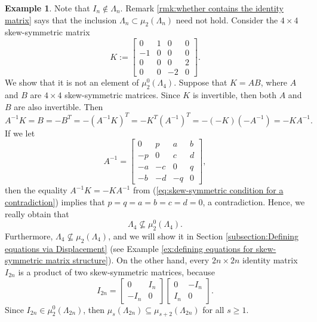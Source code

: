 \documentclass[reqno]{amsart}
\theoremstyle{definition}
\newtheorem{example}[theorem]{Example}
\numberwithin{equation}{section}
\begin{document}
\begin{example}
    Note that $I_n \notin \Lambda_n$. Remark \ref{rmk:whether contains the identity matrix} says that the inclusion $\Lambda_n \subset \mu_2(\Lambda_n)$ need not hold. Consider the $4 \times 4$ skew-symmetric matrix 
    \begin{equation*}
        K:=\begin{bmatrix}
            0 & 1 & 0 & 0\\
            -1 & 0 & 0 & 0\\
            0 & 0 & 0 & 2\\
            0 & 0 & -2 & 0
        \end{bmatrix}.
    \end{equation*}
    We show that it is not an element of $\mu_2^0(\Lambda_4)$. Suppose that $K=AB$, where $A$ and $B$ are $4 \times 4$ skew-symmetric matrices. Since $K$ is invertible, then both $A$ and $B$ are also invertible. Then 
    \begin{equation}\label{eq:skew-symmetric condition for a contradiction}
        A^{-1}K=B=-B^T=-(A^{-1}K)^T=-K^T(A^{-1})^T=-(-K)(-A^{-1})=-KA^{-1}.
    \end{equation}
    If we let
    \begin{equation*}
        A^{-1}=\begin{bmatrix}
            0 & p & a & b\\
            -p & 0 & c & d\\
            -a & -c &0 & q\\
            -b & -d &-q & 0
        \end{bmatrix},
    \end{equation*}
    then the equality $A^{-1}K=-KA^{-1}$ from (\ref{eq:skew-symmetric condition for a contradiction}) implies that $p=q=a=b=c=d=0$, a contradiction. Hence, we really obtain that
    \begin{equation*}
        \Lambda_4 \nsubseteq \mu_2^0(\Lambda_4).
    \end{equation*}
    Furthermore, $\Lambda_4 \nsubseteq \mu_2(\Lambda_4)$, and we will show it in Section \ref{subsection:Defining equations via Displacement} (see Example \ref{ex:defining equations for skew-symmetric matrix structure}). On the other hand, every $2n \times 2n$ identity matrix $I_{2n}$ is a product of two skew-symmetric matrices, because
     \begin{equation*}
         I_{2n}=\begin{bmatrix}
             0 & I_n\\
             -I_n & 0
         \end{bmatrix}\begin{bmatrix}
             0 & -I_n\\
             I_n & 0
         \end{bmatrix}.
     \end{equation*}
     Since $I_{2n} \in \mu_2^0(\Lambda_{2n})$, then $\mu_s(\Lambda_{2n}) \subseteq \mu_{s+2}(\Lambda_{2n})$ for all $s \geq 1$.
\end{example}
\end{document}
